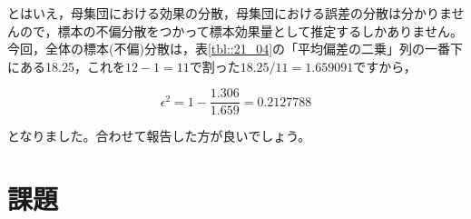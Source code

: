 \documentclass{ltjsarticle}
\begin{document}
とはいえ，母集団における効果の分散，母集団における誤差の分散は分かりませんので，標本の不偏分散をつかって標本効果量として推定するしかありません。今回，全体の標本(不偏)分散は，表\ref{tbl::21_04}の「平均偏差の二乗」列の一番下にある18.25，これを$12-1=11$で割った$18.25/11=1.659091$ですから，

\[\epsilon^2 = 1 - \frac{1.306}{1.659} = 0.2127788 \]

となりました。合わせて報告した方が良いでしょう。

\section{課題}
\end{document}
